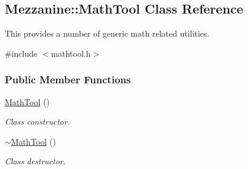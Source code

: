 \hypertarget{classMezzanine_1_1MathTool}{
\subsection{Mezzanine::MathTool Class Reference}
\label{classMezzanine_1_1MathTool}
}


This provides a number of generic math related utilities.  




{\ttfamily \#include $<$mathtool.h$>$}

\subsubsection*{Public Member Functions}
\begin{DoxyCompactItemize}
\item 
\hypertarget{classMezzanine_1_1MathTool_a0e5200de6dc0b3a3b6def86e9981d97a}{
\hyperlink{classMezzanine_1_1MathTool_a0e5200de6dc0b3a3b6def86e9981d97a}{MathTool} ()}
\label{classMezzanine_1_1MathTool_a0e5200de6dc0b3a3b6def86e9981d97a}

\begin{DoxyCompactList}\small\item\em Class constructor. \item\end{DoxyCompactList}\item 
\hypertarget{classMezzanine_1_1MathTool_aca1449215b524b2c832e78a4356ebdb4}{
\hyperlink{classMezzanine_1_1MathTool_aca1449215b524b2c832e78a4356ebdb4}{$\sim$MathTool} ()}
\label{classMezzanine_1_1MathTool_aca1449215b524b2c832e78a4356ebdb4}

\begin{DoxyCompactList}\small\item\em Class destructor. \item\end{DoxyCompactList}\end{DoxyCompactItemize}
